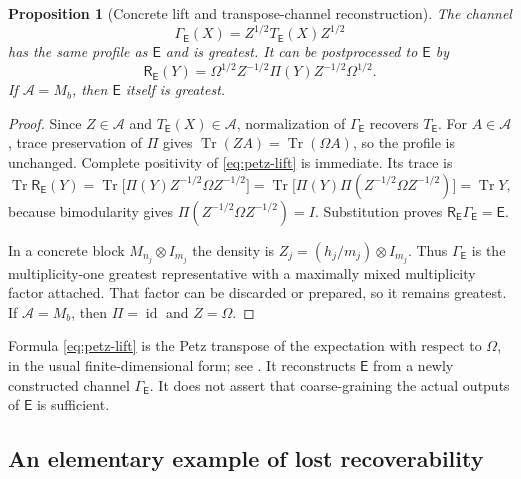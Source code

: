 \documentclass[11pt,reqno]{amsart}
\newtheorem{proposition}[theorem]{Proposition}
\theoremstyle{definition}
\theoremstyle{remark}
\numberwithin{equation}{section}
\DeclareMathOperator{\Tr}{Tr}
\DeclareMathOperator{\id}{id}
\newcommand{\A}{\mathcal A}
\newcommand{\E}{\mathsf E}
\newcommand{\R}{\mathsf R}
\begin{document}
\begin{proposition}[Concrete lift and transpose-channel reconstruction]\label{prop:concrete-lift}
The channel
\[
 \Gamma_\E(X)=Z^{1/2}T_\E(X)Z^{1/2}
\]
has the same profile as $\E$ and is greatest. It can be postprocessed to $\E$ by
\begin{equation}\label{eq:petz-lift}
 \R_\E(Y)=\Omega^{1/2}Z^{-1/2}\Pi(Y)Z^{-1/2}\Omega^{1/2}.
\end{equation}
If $\A=M_b$, then $\E$ itself is greatest.
\end{proposition}

\begin{proof}
Since $Z\in\A$ and $T_\E(X)\in\A$, normalization of $\Gamma_\E$ recovers $T_\E$. For $A\in\A$, trace preservation of $\Pi$ gives $\Tr(ZA)=\Tr(\Omega A)$, so the profile is unchanged. Complete positivity of \eqref{eq:petz-lift} is immediate. Its trace is
\[
 \Tr\R_\E(Y)
 =\Tr\bigl[\Pi(Y)Z^{-1/2}\Omega Z^{-1/2}\bigr]
 =\Tr\bigl[\Pi(Y)\Pi(Z^{-1/2}\Omega Z^{-1/2})\bigr]
 =\Tr Y,
\]
because bimodularity gives $\Pi(Z^{-1/2}\Omega Z^{-1/2})=I$. Substitution proves $\R_\E\Gamma_\E=\E$.

In a concrete block $M_{n_j}\otimes I_{m_j}$ the density is $Z_j=(h_j/m_j)\otimes I_{m_j}$. Thus $\Gamma_\E$ is the multiplicity-one greatest representative with a maximally mixed multiplicity factor attached. That factor can be discarded or prepared, so it remains greatest. If $\A=M_b$, then $\Pi=\id$ and $Z=\Omega$.
\end{proof}

Formula \eqref{eq:petz-lift} is the Petz transpose of the expectation with respect to $\Omega$, in the usual finite-dimensional form; see \cite[Theorem~3.18 and equations~(3.19)--(3.20)]{HiaiMosonyi}. It reconstructs $\E$ from a newly constructed channel $\Gamma_\E$. It does not assert that coarse-graining the actual outputs of $\E$ is sufficient.

\subsection{An elementary example of lost recoverability}
\end{document}
